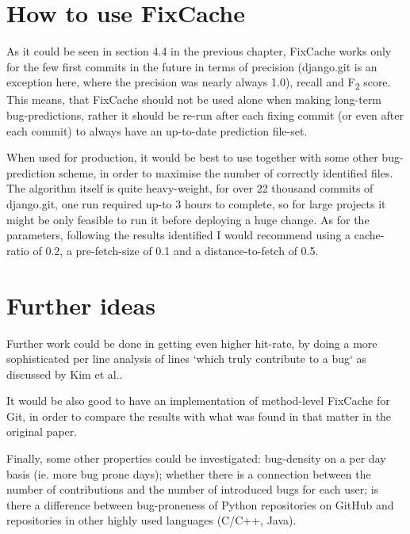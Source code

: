 \documentclass[12pt,twoside,notitlepage]{report}
\newcommand{\fxch}{FixCache}
\begin{document}
\section{How to use \fxch{}}
As it could be seen in section 4.4 in the previous chapter, \fxch{} works only for the few first commits in the future in terms of precision (django.git is an exception here, where the precision was nearly always 1.0), recall and F\textsubscript{2} score. This means, that \fxch{} should not be used alone when making long-term bug-predictions, rather it should be re-run after each fixing commit (or even after each commit) to always have an up-to-date prediction file-set.

When used for production, it would be best to use together with some other bug-prediction scheme, in order to maximise the number of correctly identified files. The algorithm itself is quite heavy-weight, for over 22 thousand commits of django.git, one run required up-to 3 hours to complete, so for large projects it might be only feasible to run it before deploying a huge change. As for the parameters, following the results identified I would recommend using a cache-ratio of 0.2, a pre-fetch-size of 0.1 and a distance-to-fetch of 0.5.
\section{Further ideas}
Further work could be done in getting even higher hit-rate, by doing a more sophisticated per line analysis of lines `which truly contribute to a bug` as discussed by Kim et al.\cite{KimZim}. 

It would be also good to have an implementation of method-level \fxch{} for Git, in order to compare the results with what was found in that matter in the original paper.

Finally, some other properties could be investigated: bug-density on a per day basis (ie. more bug prone days); whether there is a connection between the number of contributions and the number of introduced bugs for each user; is there a difference between bug-proneness of Python repositories on GitHub and repositories in other highly used languages (C/C++, Java).

\end{document}
